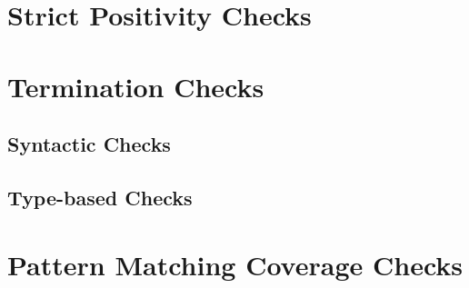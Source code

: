 \documentclass[acmsmall]{acmart}
\begin{document}
\section{Strict Positivity Checks}
\label{sec:spos}

\section{Termination Checks}
\label{sec:termination}

\subsection{Syntactic Checks}

\subsection{Type-based Checks}

\section{Pattern Matching Coverage Checks}
\label{sec:pattern}
\end{document}
